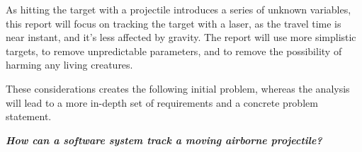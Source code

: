 As hitting the target with a projectile introduces a series of unknown variables, this report will focus on tracking the target with a laser, as the travel time is near instant, and it's less affected by gravity.
The report will use more simplistic targets, to remove unpredictable parameters, and to remove the possibility of harming any living creatures.

These considerations creates the following initial problem, whereas the analysis will lead to a more in-depth set of requirements and a concrete problem statement.
\begin{center}
  \textit{\textbf{How can a software system track a moving airborne projectile?}}
\end{center}
